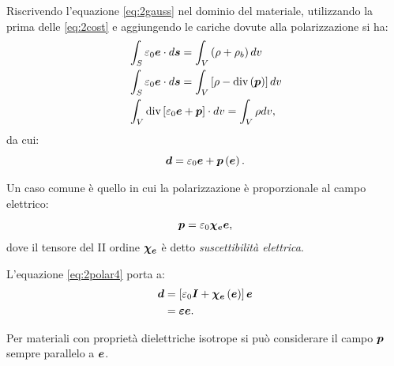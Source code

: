 \begin{itemize}
Riscrivendo l'equazione \eqref{eq:2gauss} nel dominio del materiale, utilizzando la prima delle \eqref{eq:2cost} e aggiungendo le cariche dovute alla polarizzazione si ha:
\begin{align}
\label{eq:2polar3}
&\int_S \varepsilon_0\boldsymbol{e} \cdot d\boldsymbol{s}  = \int_V \left( \rho+\rho_{b}\right) dv\nonumber\\
&\int_S \varepsilon_0\boldsymbol{e} \cdot d\boldsymbol{s}  = \int_V \left[ \rho-\text{div}\left(\boldsymbol{p}\right)\right] dv\nonumber\\
&\int_V \text{div}\left[\varepsilon_0\boldsymbol{e} + \boldsymbol{p} \right]\cdot dv  = \int_V \rho dv,\nonumber
\end{align}
da cui:
\begin{equation}
\label{eq:2polar4}
\boldsymbol{d} = \varepsilon_0 \boldsymbol{e} + \boldsymbol{p}\left(\boldsymbol{e}\right).
\end{equation}

Un caso comune è quello in cui la polarizzazione è proporzionale al campo elettrico:
\begin{equation}
\label{eq:2polar5}
\boldsymbol{p} = \varepsilon_0 \boldsymbol{\chi_e} \boldsymbol{e},
\end{equation}
dove  il tensore del II ordine $\boldsymbol{\chi_e}$ è detto \textit{suscettibilità elettrica}.

L'equazione \eqref{eq:2polar4} porta a:
\begin{equation}
\begin{split}
\label{eq:2polar6}
\boldsymbol{d} &= \left[\varepsilon_0 \boldsymbol{I}+ \boldsymbol{\chi_e}\left(\boldsymbol{e}\right)\right]\boldsymbol{e} \\
      &= \boldsymbol{\varepsilon}\boldsymbol{e}.
\end{split}
\end{equation}

Per materiali con proprietà dielettriche isotrope si può considerare il campo $\boldsymbol{p}$ sempre parallelo a $\boldsymbol{e}$. 


\end{itemize}
